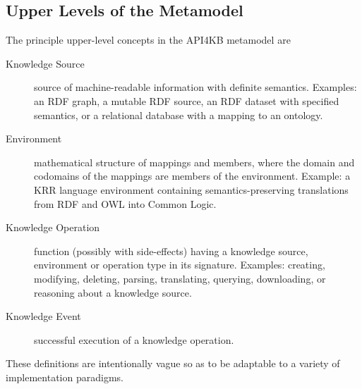 \documentclass[runningheads]{llncs}
\begin{document}
\subsection{Upper Levels of the Metamodel}
\label{sec:upper}
The principle upper-level concepts in the API4KB metamodel are
\begin{description}
\item[Knowledge Source] source of machine-readable information with definite semantics. Examples: an RDF graph, a mutable RDF source, an RDF dataset with specified semantics, or a relational database with a mapping to an ontology.
\item[Environment] mathematical structure of mappings and members, where the domain and codomains of the mappings are members of the environment.  Example: a KRR language environment containing semantics-preserving translations from RDF and OWL into Common Logic.
\item[Knowledge Operation] function (possibly with side-effects) having a knowledge source, environment or operation type in its signature. Examples: creating, modifying, deleting, parsing, translating, querying, downloading, or reasoning about a knowledge source.
\item[Knowledge Event] successful execution of a knowledge operation.
\end{description}
These definitions are intentionally vague so as to be adaptable to a variety of implementation paradigms.
\end{document}
